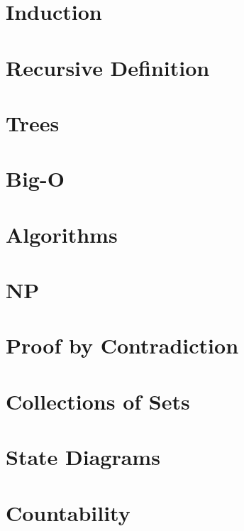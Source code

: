 \documentclass{article}
\begin{document}
\section{Induction}


\section{Recursive Definition}


\section{Trees}


\section{Big-O}


\section{Algorithms}


\section{NP}


\section{Proof by Contradiction}


\section{Collections of Sets}


\section{State Diagrams}

\section{Countability}

\end{document}
